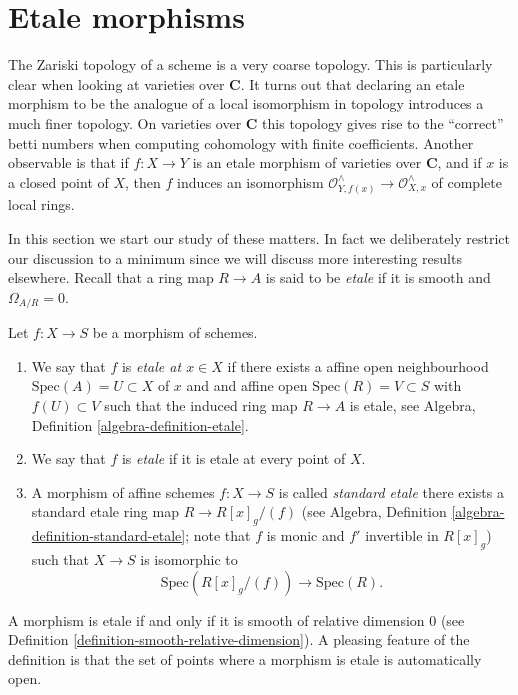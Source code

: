 \section{Etale morphisms}
\label{section-etale}

\noindent
The Zariski topology of a scheme is a very coarse topology.
This is particularly clear when looking at varieties over $\mathbf{C}$.
It turns out that declaring an etale morphism to be the analogue of a
local isomorphism in topology introduces a much finer topology. On
varieties over $\mathbf{C}$ this topology gives rise to the ``correct'' betti
numbers when computing cohomology with finite coefficients. Another
observable is that if $f : X \to Y$ is an etale morphism of varieties over
$\mathbf{C}$, and if $x$ is a closed point of $X$, then 
$f$ induces an isomorphism
$\mathcal{O}^{\wedge}_{Y, f(x)} \to \mathcal{O}^{\wedge}_{X, x}$
of complete local rings.

\medskip\noindent
In this section we start our study of these matters. In fact we deliberately
restrict our discussion to a minimum since we will discuss more interesting
results elsewhere. Recall that a ring map $R \to A$ is said to be {\it etale}
if it is smooth and $\Omega_{A/R} = 0$.

\begin{definition}
\label{definition-etale}
Let $f : X \to S$ be a morphism of schemes.
\begin{enumerate}
\item We say that $f$ is {\it etale at $x \in X$} if
there exists a affine open neighbourhood $\text{Spec}(A) = U \subset X$
of $x$ and and affine open $\text{Spec}(R) = V \subset S$
with $f(U) \subset V$ such that the induced ring map
$R \to A$ is etale, see Algebra, Definition \ref{algebra-definition-etale}.
\item We say that $f$ is {\it etale} if it is etale at every point of $X$.
\item A morphism of affine schemes $f : X \to S$
is called {\it standard etale} there exists a standard etale ring
map $R \to R[x]_g/(f)$ (see
Algebra, Definition \ref{algebra-definition-standard-etale}; note that
$f$ is monic and $f'$ invertible in $R[x]_g$)
such that $X \to S$ is isomorphic to
$$
\text{Spec}(R[x]_g/(f)) \to \text{Spec}(R).
$$
\end{enumerate}
\end{definition}

\noindent
A morphism is etale if and only if it is smooth of relative dimension $0$
(see Definition \ref{definition-smooth-relative-dimension}).
A pleasing feature of the definition is that the set of points
where a morphism is etale is automatically open.

